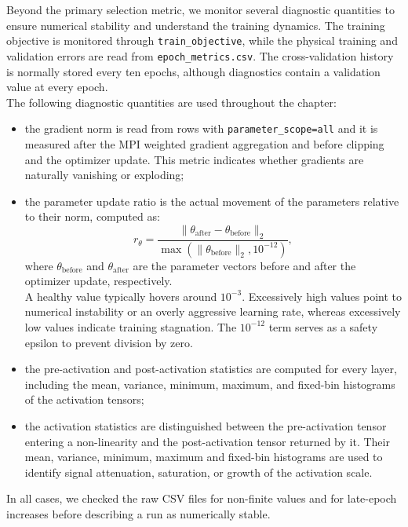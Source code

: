 Beyond the primary selection metric, we monitor several diagnostic quantities to ensure numerical stability and understand the training dynamics. The training objective is monitored through \texttt{train\_objective}, while the physical training and validation errors are read from \texttt{epoch\_metrics.csv}. The cross-validation history is normally stored every ten epochs, although diagnostics contain a validation value at every epoch.\\
The following diagnostic quantities are used throughout the chapter:
\begin{itemize}
    \item[-] the gradient norm is read from rows with \texttt{parameter\_scope=all} and it is measured after the MPI weighted gradient aggregation and before clipping and the optimizer update. This metric indicates whether gradients are naturally vanishing or exploding;
    \item[-] the parameter update ratio is the actual movement of the parameters relative to their norm, computed as:
    \begin{equation}
    r_{\theta} =
    \frac{\lVert\theta_{\mathrm{after}}-\theta_{\mathrm{before}}\rVert_2}
    {\max\left(\lVert\theta_{\mathrm{before}}\rVert_2,10^{-12}\right)},
    \label{eq:04_update_ratio}
\end{equation}
    where $\theta_{\mathrm{before}}$ and $\theta_{\mathrm{after}}$ are the parameter vectors before and after the optimizer update, respectively.\\
    A healthy value typically hovers around $10^{-3}$. Excessively high values point to numerical instability or an overly aggressive learning rate, whereas excessively low values indicate training stagnation. The $10^{-12}$ term serves as a safety epsilon to prevent division by zero.
    \item[-] the pre-activation and post-activation statistics are computed for every layer, including the mean, variance, minimum, maximum, and fixed-bin histograms of the activation tensors;
    \item[-] the activation statistics are distinguished between the pre-activation tensor entering a non-linearity and the post-activation tensor returned by it. Their mean, variance, minimum, maximum and fixed-bin histograms are used to identify signal attenuation, saturation, or growth of the activation scale.
\end{itemize}
In all cases, we checked the raw CSV files for non-finite values and for late-epoch increases before describing a run as numerically stable.
